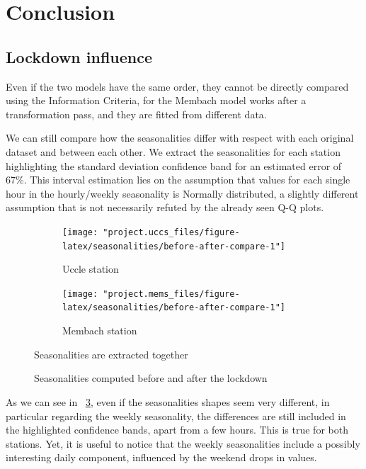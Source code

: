 \documentclass[12pt]{article}
\begin{document}
\section{Conclusion}
\subsection{Lockdown influence}
Even if the two models have the same order, they cannot be directly compared using the Information Criteria, for the Membach model works after a transformation pass, and they are fitted from different data.

We can still compare how the seasonalities differ with respect with each original dataset and between each other. We extract the seasonalities for each station highlighting the standard deviation confidence band for an estimated error of 67\%. This interval estimation lies on the assumption that values for each single hour in the hourly/weekly seasonality is Normally distributed, a slightly different assumption that is not necessarily refuted by the already seen Q-Q plots.

\begin{figure}[h]
	\begin{subfigure}{.5\linewidth}
		\texttt{[image: "project.uccs\_files/figure-latex/seasonalities/before-after-compare-1"]}
		\caption{Uccle station}
		\label{fig:season.lockdown:uccs}
	\end{subfigure}
	\begin{subfigure}{.5\linewidth}
		\texttt{[image: "project.mems\_files/figure-latex/seasonalities/before-after-compare-1"]}
		\caption{Membach station}
		\label{fig:season.lockdown:mems}
	\end{subfigure}
	\begin{center}
		\caption{Seasonalities computed before and after the lockdown}{\small Seasonalities are extracted together}
		\label{fig:season.lockdown}
	\end{center}
\end{figure}


As we can see in \figurename~\ref{fig:season.lockdown}, even if the seasonalities shapes seem very different, in particular regarding the weekly seasonality, the differences are still included in the highlighted confidence bands, apart from a few hours. This is true for both stations.
Yet, it is useful to notice that the weekly seasonalities include a possibly interesting daily component, influenced by the weekend drops in values.

\end{document}
